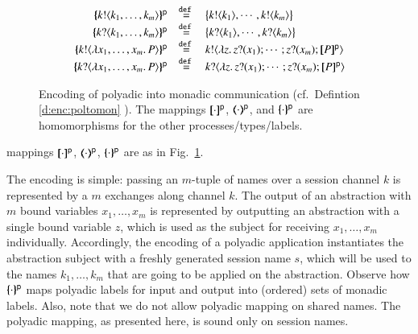 \begin{definition}
\begin{figure}[t]
\[\begin{array}{rcl}
		\\ %
		\mapa{\bactout{k}{k_1, \ldots, k_m}}^\mathsf{p} &\defeq&   \big\{\bactout{k}{k_1}, \cdots, \bactout{k}{k_m}\big\} \\
		\mapa{\bactinp{k}{k_1, \ldots, k_m}}^\mathsf{p} &\defeq&   \big\{\bactinp{k}{k_1}, \cdots, \bactinp{k}{k_m} \big\}\\
		\mapa{\bactout{k}{\abs{x_1, \ldots, x_m}{P}} }^\mathsf{p} &\defeq&  \bactout{k}{\abs{z}\binp{z}{x_1} \cdots ; \binp{z}{x_m} \map{P}^{\mathsf{p}}} \\
		\mapa{\bactinp{k}{\abs{x_1, \ldots, x_m}{P}} }^\mathsf{p} &\defeq&  \bactinp{k}{\abs{z}\binp{z}{x_1} \cdots ; \binp{z}{x_m} \map{P}^{\mathsf{p}}} 
	\end{array}
\]
\caption{
Encoding of polyadic into monadic communication (cf.~Defintion \ref{d:enc:poltomon} \label{f:enc:poltomon}).
The mappings 
$[\!\![\cdot]\!\!]^\mathsf{p}$,
$(\!\!\langle\cdot\rangle\!\!)^\mathsf{p}$, 
and 
$\{\!\!\{\cdot\}\!\!\}^\mathsf{p}$
are homomorphisms for the other processes/types/labels. 
}
\end{figure}
mappings $[\!\![\cdot]\!\!]^{\mathsf{p}}$, $(\!\!\langle\cdot\rangle\!\!)^{\mathsf{p}}$, $\{\!\!\{\cdot\}\!\!\}^{\mathsf{p}}$
are 
as in Fig.~\ref{f:enc:poltomon}.
\end{definition}
%
The encoding is simple:
passing an $m$-tuple of names over a session channel $k$ is represented by 
a $m$ exchanges along channel $k$.
The output of an abstraction with $m$ bound variables $x_1, \ldots, x_m$ is represented by
outputting an abstraction with a single bound variable $z$,
which is used as the subject for receiving $x_1, \ldots, x_m$ individually. 
Accordingly, 
the encoding of a polyadic application  instantiates
the abstraction subject with a freshly generated session name $s$, which will be used  
to the names 
$k_1, \ldots, k_m$
that are going to be applied on the abstraction.
Observe how $\{\!\!\{\cdot\}\!\!\}^{\mathsf{p}}$ maps polyadic labels for input and output into (ordered) sets of
monadic labels. Also, note that we do not allow polyadic mapping on shared names.
The polyadic mapping, as presented here, is sound only on session names.

